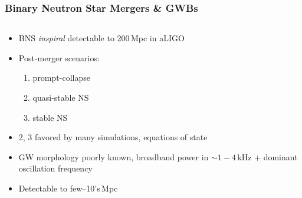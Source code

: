 \documentclass{beamer}
\begin{document}
\begin{frame}
    \frametitle{Binary Neutron Star Mergers \& GWBs}
    \begin{columns}[]
        \begin{center}

            \begin{small}
                \begin{itemize}
                    \item BNS \emph{inspiral} detectable to 200\,Mpc in
                        aLIGO\footnotemark
                    \item Post-merger scenarios:
                        \begin{enumerate}
                            \item prompt-collapse
                            \item quasi-stable NS
                            \item stable NS
                        \end{enumerate}
                    \item 2, 3 favored by many simulations, equations of state
                    \item GW morphology poorly known, broadband power in $\sim
                        1-4$\,kHz + dominant oscillation frequency
                    \item Detectable to few--10's\,Mpc

                \end{itemize}
            \end{small}

    \end{center}




\end{columns}
\end{frame}
\end{document}
